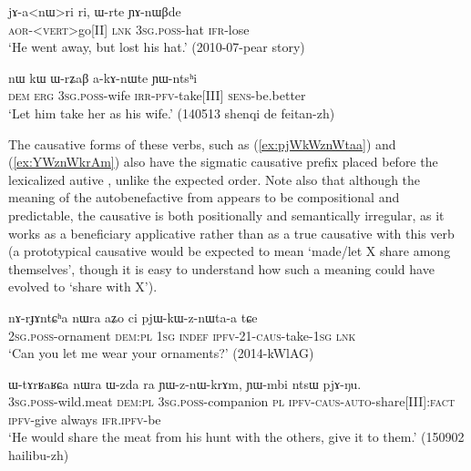 \begin{exe}
\ex \label{ex:Wrte.YAnWBde2}
\gll jɤ-a<nɯ>ri ri, ɯ-rte ɲɤ-nɯβde \\
\textsc{aor}-<\textsc{vert}>go[II] \textsc{lnk} \textsc{3sg}.\textsc{poss}-hat \textsc{ifr}-lose\\
\glt `He went away, but lost his hat.' (2010-07-pear story)
\end{exe}

\begin{exe}
\ex \label{ex:WrZaB.akAnWte}
\gll nɯ kɯ ɯ-rʑaβ a-kɤ-nɯte ɲɯ-ntsʰi \\
\textsc{dem} \textsc{erg} \textsc{3sg}.\textsc{poss}-wife \textsc{irr}-\textsc{pfv}-take[III] \textsc{sens}-be.better \\
\glt `Let him take her as his wife.' (140513 shenqi de feitan-zh) 
\end{exe}

The causative forms of these  verbs, such as   (\ref{ex:pjWkWznWtaa}) and  (\ref{ex:YWznWkrAm}) also have the sigmatic causative prefix placed before the lexicalized autive , unlike the expected order.  Note also that although the meaning of the autobenefactive  from    appears to be compositional and predictable, the causative is both positionally and semantically irregular, as it works as a beneficiary applicative rather than as a true causative with this verb (a prototypical causative would be expected to mean `made/let X share among themselves', though it is easy to understand how such a meaning could have evolved to `share with X').

\begin{exe}
\ex \label{ex:pjWkWznWtaa}
\gll nɤ-rɟɤntɕʰa nɯra aʑo ci pjɯ-kɯ-z-nɯta-a tɕe \\
\textsc{2sg}.\textsc{poss}-ornament \textsc{dem}:\textsc{pl} \textsc{1sg} \textsc{indef} \textsc{ipfv}-2\fl{}1-\textsc{caus}-take-\textsc{1sg} \textsc{lnk} \\
\glt `Can you let me wear your ornaments?' (2014-kWlAG)
\end{exe}

\begin{exe}
\ex \label{ex:YWznWkrAm}
\gll ɯ-tɤrʁaʁɕa nɯra ɯ-zda ra ɲɯ-z-nɯ-krɤm, ɲɯ-mbi ntsɯ pjɤ-ŋu. \\
\textsc{3sg}.\textsc{poss}-wild.meat \textsc{dem}:\textsc{pl} \textsc{3sg}.\textsc{poss}-companion \textsc{pl} \textsc{ipfv}-\textsc{caus}-\textsc{auto}-share[III]:\textsc{fact} \textsc{ipfv}-give always \textsc{ifr}.\textsc{ipfv}-be \\
\glt `He would share the meat from his hunt with the others, give it to them.' (150902 hailibu-zh)
\end{exe}

